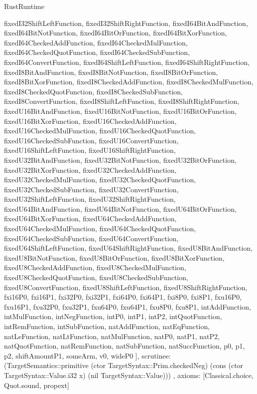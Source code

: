 \begin{lexlean}{RustRuntime}
\begin{semanticmodule}
{{      fixedI32ShiftLeftFunction,
      fixedI32ShiftRightFunction,
      fixedI64BitAndFunction,
      fixedI64BitNotFunction,
      fixedI64BitOrFunction,
      fixedI64BitXorFunction,
      fixedI64CheckedAddFunction,
      fixedI64CheckedMulFunction,
      fixedI64CheckedQuotFunction,
      fixedI64CheckedSubFunction,
      fixedI64ConvertFunction,
      fixedI64ShiftLeftFunction,
      fixedI64ShiftRightFunction,
      fixedI8BitAndFunction,
      fixedI8BitNotFunction,
      fixedI8BitOrFunction,
      fixedI8BitXorFunction,
      fixedI8CheckedAddFunction,
      fixedI8CheckedMulFunction,
      fixedI8CheckedQuotFunction,
      fixedI8CheckedSubFunction,
      fixedI8ConvertFunction,
      fixedI8ShiftLeftFunction,
      fixedI8ShiftRightFunction,
      fixedU16BitAndFunction,
      fixedU16BitNotFunction,
      fixedU16BitOrFunction,
      fixedU16BitXorFunction,
      fixedU16CheckedAddFunction,
      fixedU16CheckedMulFunction,
      fixedU16CheckedQuotFunction,
      fixedU16CheckedSubFunction,
      fixedU16ConvertFunction,
      fixedU16ShiftLeftFunction,
      fixedU16ShiftRightFunction,
      fixedU32BitAndFunction,
      fixedU32BitNotFunction,
      fixedU32BitOrFunction,
      fixedU32BitXorFunction,
      fixedU32CheckedAddFunction,
      fixedU32CheckedMulFunction,
      fixedU32CheckedQuotFunction,
      fixedU32CheckedSubFunction,
      fixedU32ConvertFunction,
      fixedU32ShiftLeftFunction,
      fixedU32ShiftRightFunction,
      fixedU64BitAndFunction,
      fixedU64BitNotFunction,
      fixedU64BitOrFunction,
      fixedU64BitXorFunction,
      fixedU64CheckedAddFunction,
      fixedU64CheckedMulFunction,
      fixedU64CheckedQuotFunction,
      fixedU64CheckedSubFunction,
      fixedU64ConvertFunction,
      fixedU64ShiftLeftFunction,
      fixedU64ShiftRightFunction,
      fixedU8BitAndFunction,
      fixedU8BitNotFunction,
      fixedU8BitOrFunction,
      fixedU8BitXorFunction,
      fixedU8CheckedAddFunction,
      fixedU8CheckedMulFunction,
      fixedU8CheckedQuotFunction,
      fixedU8CheckedSubFunction,
      fixedU8ConvertFunction,
      fixedU8ShiftLeftFunction,
      fixedU8ShiftRightFunction,
      fxi16P0,
      fxi16P1,
      fxi32P0,
      fxi32P1,
      fxi64P0,
      fxi64P1,
      fxi8P0,
      fxi8P1,
      fxu16P0,
      fxu16P1,
      fxu32P0,
      fxu32P1,
      fxu64P0,
      fxu64P1,
      fxu8P0,
      fxu8P1,
      intAddFunction,
      intMulFunction,
      intNegFunction,
      intP0,
      intP1,
      intP2,
      intQuotFunction,
      intRemFunction,
      intSubFunction,
      natAddFunction,
      natEqFunction,
      natLeFunction,
      natLtFunction,
      natMulFunction,
      natP0,
      natP1,
      natP2,
      natQuotFunction,
      natRemFunction,
      natSubFunction,
      natSuccFunction,
      p0,
      p1,
      p2,
      shiftAmountP1,
      someArm,
      v0,
      wideP0
    ],
    scrutinee: (TargetSemantics::primitive (ctor TargetSyntax::Prim.checkedNeg) (cons (ctor TargetSyntax::Value.i32 x) (nil TargetSyntax::Value)))
  },
  axioms: [Classical.choice, Quot.sound, propext]
}


\end{semanticmodule}
\end{lexlean}
